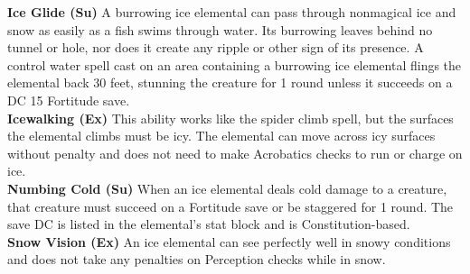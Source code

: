\textbf{Ice Glide (Su)} A burrowing ice elemental can pass through nonmagical ice and snow as easily as a fish swims through water. Its burrowing leaves behind no tunnel or hole, nor does it create any ripple or other sign of its presence. A control water spell cast on an area containing a burrowing ice elemental flings the elemental back 30 feet, stunning the creature for 1 round unless it succeeds on a DC 15 Fortitude save. \\

\textbf{Icewalking (Ex)} This ability works like the spider climb spell, but the surfaces the elemental climbs must be icy. The elemental can move across icy surfaces without penalty and does not need to make Acrobatics checks to run or charge on ice. \\

\textbf{Numbing Cold (Su)} When an ice elemental deals cold damage to a creature, that creature must succeed on a Fortitude save or be staggered for 1 round. The save DC is listed in the elemental’s stat block and is Constitution-based. \\

\textbf{Snow Vision (Ex)} An ice elemental can see perfectly well in snowy conditions and does not take any penalties on Perception checks while in snow. \\

\newpage
